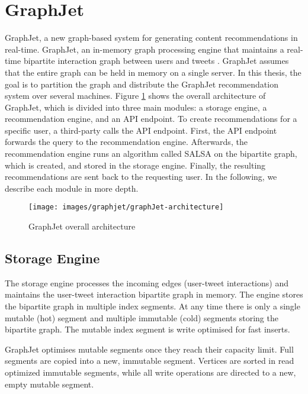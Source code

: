\section{GraphJet}
\label{sec:GraphJet}
GraphJet, a new graph-based system for generating content recommendations in real-time. GraphJet, an in-memory graph processing engine that maintains a real-time bipartite interaction graph between users and tweets \cite{sharma2016graphjet}. GraphJet assumes that the entire graph can be held in memory on a single server. In this thesis, the goal is to partition the graph and distribute the GraphJet recommendation system over several machines. Figure \ref{fig:graphJet-architecture} shows the overall architecture of GraphJet, which is divided into three main modules: a storage engine, a recommendation engine, and an API endpoint. To create recommendations for a specific user, a third-party calls the API endpoint. First, the API endpoint forwards the query to the recommendation engine. Afterwards, the recommendation engine runs an algorithm called SALSA on the bipartite graph, which is created, and stored in the storage engine. Finally, the resulting recommendations are sent back to the requesting user. In the following, we describe each module in more depth.

\begin{figure}[!h]
	\centering
	\texttt{[image: images/graphjet/graphJet-architecture]}
	\caption{GraphJet overall architecture}
	\label{fig:graphJet-architecture}
\end{figure}


\subsection{Storage Engine}
\label{subsec:GraphJet-Storage-Engine}
The storage engine processes the incoming edges (user-tweet interactions) and maintains the user-tweet interaction bipartite graph in memory. The engine stores the bipartite graph in multiple index segments. At any time there is only a single mutable (hot) segment and multiple immutable (cold) segments storing the bipartite graph. The mutable index segment is write optimised for fast inserts. 

GraphJet optimises mutable segments once they reach their capacity limit. Full segments are copied into a new, immutable segment. Vertices are sorted in read optimized immutable segments, while all write operations are directed to a new, empty mutable segment.

